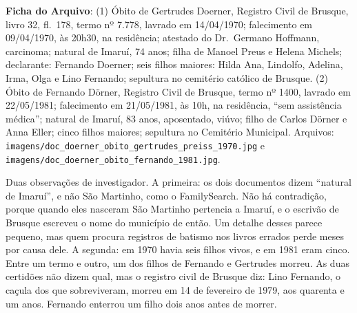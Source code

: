 \documentclass[
  brazilian,
  11pt,
  openany]{book}
\begin{document}
\begin{ficha}

\textbf{Ficha do Arquivo}: (1) Óbito de Gertrudes Doerner, Registro
Civil de Brusque, livro 32, fl.~178, termo nº 7.778, lavrado em
14/04/1970; falecimento em 09/04/1970, às 20h30, na residência; atestado
do Dr.~Germano Hoffmann, carcinoma; natural de Imaruí, 74 anos; filha de
Manoel Preus e Helena Michels; declarante: Fernando Doerner; seis filhos
maiores: Hilda Ana, Lindolfo, Adelina, Irma, Olga e Lino Fernando;
sepultura no cemitério católico de Brusque. (2) Óbito de Fernando
Dörner, Registro Civil de Brusque, termo nº 1400, lavrado em 22/05/1981;
falecimento em 21/05/1981, às 10h, na residência, ``sem assistência
médica''; natural de Imaruí, 83 anos, aposentado, viúvo; filho de Carlos
Dörner e Anna Eller; cinco filhos maiores; sepultura no Cemitério
Municipal. Arquivos:
\texttt{imagens/doc\_doerner\_obito\_gertrudes\_preiss\_1970.jpg} e
\texttt{imagens/doc\_doerner\_obito\_fernando\_1981.jpg}.

\end{ficha}

Duas observações de investigador. A primeira: os dois documentos dizem
``natural de Imaruí'', e não São Martinho, como o FamilySearch. Não há
contradição, porque quando eles nasceram São Martinho pertencia a
Imaruí, e o escrivão de Brusque escreveu o nome do município de então.
Um detalhe desses parece pequeno, mas quem procura registros de batismo
nos livros errados perde meses por causa dele. A segunda: em 1970 havia
seis filhos vivos, e em 1981 eram cinco. Entre um termo e outro, um dos
filhos de Fernando e Gertrudes morreu. As duas certidões não dizem qual,
mas o registro civil de Brusque diz: Lino Fernando, o caçula dos que
sobreviveram, morreu em 14 de fevereiro de 1979, aos quarenta e um anos.
Fernando enterrou um filho dois anos antes de morrer.
\end{document}
